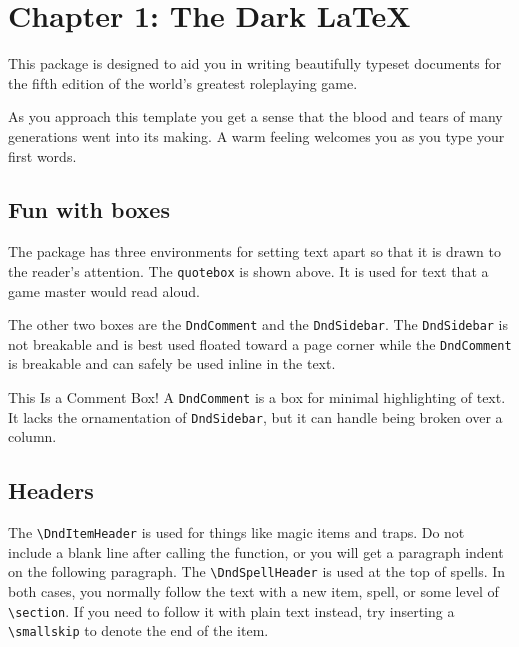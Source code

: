 \documentclass[letterpaper,10pt,twoside,twocolumn,openany]{dndbook}
\begin{document}
\chapter{Chapter 1: The Dark \LaTeX}

This package is designed to aid you in writing beautifully typeset documents for the fifth edition of the world's greatest roleplaying game.

\begin{DndReadAloud}
  As you approach this template you get a sense that the blood and tears of many generations went into its making. A warm feeling welcomes you as you type your first words.
\end{DndReadAloud}

\section{Fun with boxes}
The package has three environments for setting text apart so that it is drawn to the reader's attention. The \lstinline!quotebox! is shown above. It is used for text that a game master would read aloud.

The other two boxes are the \lstinline!DndComment! and the \lstinline!DndSidebar!. The \lstinline!DndSidebar! is not breakable and is best used floated toward a page corner while the \lstinline!DndComment! is breakable and can safely be used inline in the text.

\begin{DndComment}{This Is a Comment Box!}
  A \lstinline!DndComment! is a box for minimal highlighting of text. It lacks the ornamentation of \lstinline!DndSidebar!, but it can handle being broken over a column.
\end{DndComment}

\section{Headers}

The \lstinline!\DndItemHeader! is used for things like magic items and traps. Do not include a blank line after calling the function, or you will get a paragraph indent on the following paragraph. The \lstinline!\DndSpellHeader! is used at the top of spells. In both cases, you normally follow the text with a new item, spell, or some level of \lstinline!\section!. If you need to follow it with plain text instead, try inserting a \lstinline!\smallskip! to denote the end of the item.
\end{document}
